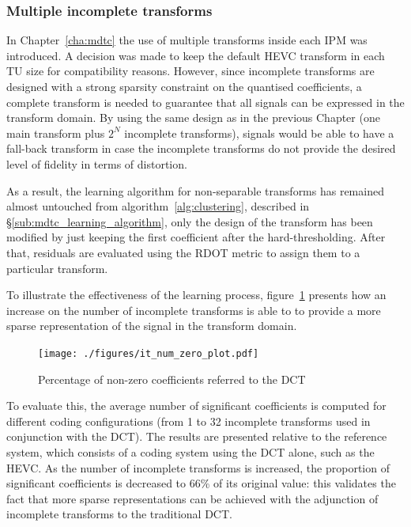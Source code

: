 \documentclass[11pt,a4paper,openright,twoside]{book}
\numberwithin{equation}{section} %
\numberwithin{figure}{section} %
\numberwithin{table}{section} %
\begin{document}
\subsubsection{Multiple incomplete transforms}
\label{ssub:it_multiple_incomplete_transforms}

In Chapter~\ref{cha:mdtc} the use of multiple transforms inside each \ac{IPM}
was introduced.
A decision was made to keep the default \ac{HEVC} transform in each \ac{TU}
size for compatibility reasons.
However, since incomplete transforms are designed with a strong sparsity
constraint on the quantised coefficients, a complete transform is needed to
guarantee that all signals can be expressed in the transform domain.
By using the same design as in the previous Chapter (one main transform plus
$2^N$ incomplete transforms), signals would be able to have a fall-back
transform in case the incomplete transforms do not provide the desired level
of fidelity in terms of distortion.

As a result, the learning algorithm for non-separable transforms has remained
almost untouched from algorithm~\ref{alg:clustering}, described in
\S\ref{sub:mdtc_learning_algorithm}, only the design of the transform has been
modified by just keeping the first coefficient after the hard-thresholding.
After that, residuals are evaluated using the \ac{RDOT} metric to assign them
to a particular transform.

To illustrate the effectiveness of the learning process,
figure~\ref{fig:it_num_zero} presents how an increase on the number of
incomplete transforms is able to to provide a more sparse representation of
the signal in the transform domain.

\begin{figure}[tp]
	\centering
	\texttt{[image: ./figures/it\_num\_zero\_plot.pdf]}
	\caption{Percentage of non-zero coefficients referred to the \acs{DCT}}
	\label{fig:it_num_zero}
\end{figure}

To evaluate this, the average number of significant coefficients is computed
for different coding configurations (from 1 to 32 incomplete transforms used
in conjunction with the \ac{DCT}).
The results are presented relative to the reference system, which consists of
a coding system using the \ac{DCT} alone, such as the \ac{HEVC}.
As the number of incomplete transforms is increased, the proportion of
significant coefficients is decreased to 66\% of its original value:
this validates the fact that more sparse representations can be achieved with
the adjunction of incomplete transforms to the traditional \ac{DCT}.
\end{document}
